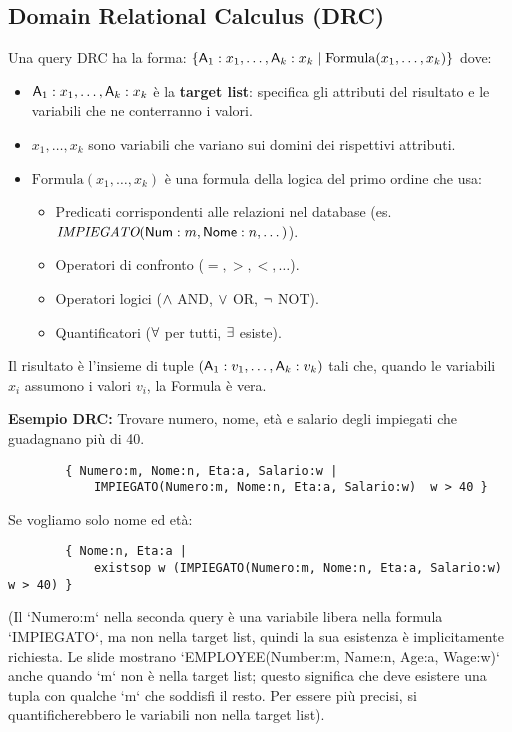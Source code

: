 	\subsection{Domain Relational Calculus (DRC)}
	Una query DRC ha la forma:
	$\{ \textsf{A}_1:x_1, \dots, \textsf{A}_k:x_k \mid \text{Formula}(x_1, \dots, x_k) \}$
	dove:
	\begin{itemize}
		\item $\textsf{A}_1:x_1, \dots, \textsf{A}_k:x_k$ è la \textbf{target list}: specifica gli attributi del risultato e le variabili che ne conterranno i valori.
		\item $x_1, \dots, x_k$ sono variabili che variano sui domini dei rispettivi attributi.
		\item $\text{Formula}(x_1, \dots, x_k)$ è una formula della logica del primo ordine che usa:
		\begin{itemize}
			\item Predicati corrispondenti alle relazioni nel database (es. $\textit{IMPIEGATO}(\textsf{Num}:m, \textsf{Nome}:n, \dots)$).
			\item Operatori di confronto ($=, >, <, \dots$).
			\item Operatori logici ($\wedge$ AND, $\vee$ OR, $\neg$ NOT).
			\item Quantificatori ($\forall$ per tutti, $\exists$ esiste).
		\end{itemize}
	\end{itemize}
	Il risultato è l'insieme di tuple $(\textsf{A}_1:v_1, \dots, \textsf{A}_k:v_k)$ tali che, quando le variabili $x_i$ assumono i valori $v_i$, la Formula è vera.
	
	\textbf{Esempio DRC:} Trovare numero, nome, età e salario degli impiegati che guadagnano più di 40.
	\begin{verbatim}
		{ Numero:m, Nome:n, Eta:a, Salario:w |
			IMPIEGATO(Numero:m, Nome:n, Eta:a, Salario:w)  w > 40 }
	\end{verbatim}
	Se vogliamo solo nome ed età:
	\begin{verbatim}
		{ Nome:n, Eta:a |
			existsop w (IMPIEGATO(Numero:m, Nome:n, Eta:a, Salario:w)  w > 40) }
	\end{verbatim}
	(Il `Numero:m` nella seconda query è una variabile libera nella formula `IMPIEGATO`, ma non nella target list, quindi la sua esistenza è implicitamente richiesta. Le slide mostrano `EMPLOYEE(Number:m, Name:n, Age:a, Wage:w)` anche quando `m` non è nella target list; questo significa che deve esistere una tupla con qualche `m` che soddisfi il resto. Per essere più precisi, si quantificherebbero le variabili non nella target list).
	
